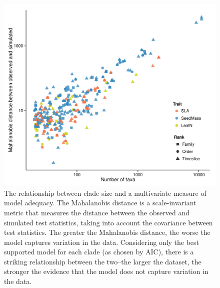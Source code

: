 \documentclass[12pt,twoside]{article}
\begin{document}
\begin{figure}[p]
  \centering
  \includegraphics[width=\textwidth]{figs/ad-size-ml}
  \caption[Model adequacy vs. clade size (ML)]{The relationship between clade size and a multivariate measure of model adequacy. The Mahalanobis distance is a scale-invariant metric that measures the distance between the observed and simulated test statistics, taking into account the covariance between test statistics. The greater the Mahalanobis distance, the worse the model captures variation in the data. Considering only the best supported model for each clade (as chosen by AIC), there is a striking relationship between the two--the larger the dataset, the stronger the evidence that the model does not capture variation in the data.}
  \label{fig:size-adequacy}
\end{figure}


\end{document}
